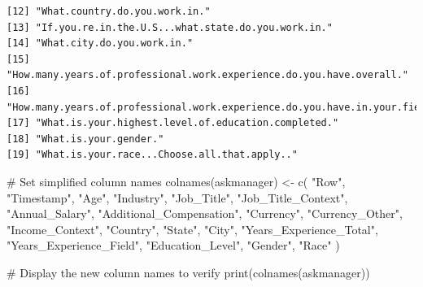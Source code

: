 \documentclass[
  letterpaper,
  DIV=11,
  numbers=noendperiod]{scrartcl}
\newenvironment{Shaded}{\begin{snugshade}}{\end{snugshade}}
\newcommand{\CommentTok}[1]{\textcolor[rgb]{0.37,0.37,0.37}{#1}}
\newcommand{\FunctionTok}[1]{\textcolor[rgb]{0.28,0.35,0.67}{#1}}
\newcommand{\NormalTok}[1]{\textcolor[rgb]{0.00,0.23,0.31}{#1}}
\newcommand{\OtherTok}[1]{\textcolor[rgb]{0.00,0.23,0.31}{#1}}
\newcommand{\StringTok}[1]{\textcolor[rgb]{0.13,0.47,0.30}{#1}}
\begin{document}
\begin{verbatim}
[12] "What.country.do.you.work.in."                                                                                                                                                                                                        
[13] "If.you.re.in.the.U.S...what.state.do.you.work.in."                                                                                                                                                                                   
[14] "What.city.do.you.work.in."                                                                                                                                                                                                           
[15] "How.many.years.of.professional.work.experience.do.you.have.overall."                                                                                                                                                                 
[16] "How.many.years.of.professional.work.experience.do.you.have.in.your.field."                                                                                                                                                           
[17] "What.is.your.highest.level.of.education.completed."                                                                                                                                                                                  
[18] "What.is.your.gender."                                                                                                                                                                                                                
[19] "What.is.your.race...Choose.all.that.apply.."                                                                                                                                                                                         
\end{verbatim}

\begin{Shaded}
\begin{Highlighting}[]
\CommentTok{\# Set simplified column names}
\FunctionTok{colnames}\NormalTok{(askmanager) }\OtherTok{\textless{}{-}} \FunctionTok{c}\NormalTok{(}
  \StringTok{"Row"}\NormalTok{, }\StringTok{"Timestamp"}\NormalTok{, }\StringTok{"Age"}\NormalTok{, }\StringTok{"Industry"}\NormalTok{, }\StringTok{"Job\_Title"}\NormalTok{, }
  \StringTok{"Job\_Title\_Context"}\NormalTok{, }\StringTok{"Annual\_Salary"}\NormalTok{, }\StringTok{"Additional\_Compensation"}\NormalTok{, }
  \StringTok{"Currency"}\NormalTok{, }\StringTok{"Currency\_Other"}\NormalTok{, }\StringTok{"Income\_Context"}\NormalTok{, }
  \StringTok{"Country"}\NormalTok{, }\StringTok{"State"}\NormalTok{, }\StringTok{"City"}\NormalTok{, }
  \StringTok{"Years\_Experience\_Total"}\NormalTok{, }\StringTok{"Years\_Experience\_Field"}\NormalTok{, }
  \StringTok{"Education\_Level"}\NormalTok{, }\StringTok{"Gender"}\NormalTok{, }\StringTok{"Race"}
\NormalTok{)}

\CommentTok{\# Display the new column names to verify}
\FunctionTok{print}\NormalTok{(}\FunctionTok{colnames}\NormalTok{(askmanager))}
\end{Highlighting}
\end{Shaded}
\end{document}
